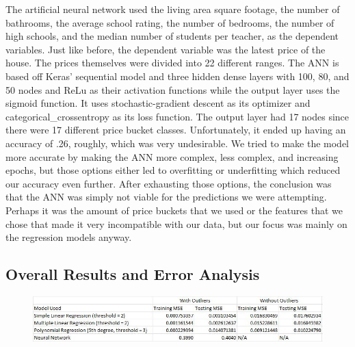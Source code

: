 \documentclass[12pt]{article}
\begin{document}
	The artificial neural network used the living area square footage, the number of bathrooms, the average school rating, the number of bedrooms, the number of high schools, and the median number of students per teacher, as the dependent variables. Just like before, the dependent variable was the latest price of the house. The prices themselves were divided into 22 different ranges. The ANN is based off Keras' sequential model and three hidden dense layers with 100, 80, and 50 nodes and ReLu as their activation functions while the output layer uses the sigmoid function. It uses stochastic-gradient descent as its optimizer and categorical\_crossentropy as its loss function. The output layer had 17 nodes since there were 17 different price bucket classes. Unfortunately, it ended up having an accuracy of .26, roughly, which was very undesirable. We tried to make the model more accurate by making the ANN more complex, less complex, and increasing epochs, but those options either led to overfitting or underfitting which reduced our accuracy even further. After exhausting those options, the conclusion was that the ANN was simply not viable for the predictions we were attempting. Perhaps it was the amount of price buckets that we used or the features that we chose that made it very incompatible with our data, but our focus was mainly on the regression models anyway.
	
	\subsection{Overall Results and Error Analysis}
	
	\begin{figure}[H]
		\label{fig:fig5}
		\includegraphics[width=1\linewidth]{fig5}
	\end{figure}
	
\end{document}
